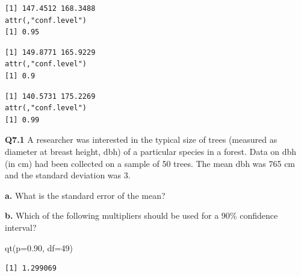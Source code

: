 \documentclass[
  oneside]{krantz}
\newenvironment{Shaded}{\begin{snugshade}}{\end{snugshade}}
\newcommand{\AttributeTok}[1]{\textcolor[rgb]{0.77,0.63,0.00}{#1}}
\newcommand{\CommentTok}[1]{\textcolor[rgb]{0.56,0.35,0.01}{\textit{#1}}}
\newcommand{\DecValTok}[1]{\textcolor[rgb]{0.00,0.00,0.81}{#1}}
\newcommand{\FloatTok}[1]{\textcolor[rgb]{0.00,0.00,0.81}{#1}}
\newcommand{\FunctionTok}[1]{\textcolor[rgb]{0.00,0.00,0.00}{#1}}
\newcommand{\NormalTok}[1]{#1}
\newcommand{\SpecialCharTok}[1]{\textcolor[rgb]{0.00,0.00,0.00}{#1}}
\begin{document}
\begin{verbatim}
[1] 147.4512 168.3488
attr(,"conf.level")
[1] 0.95
\end{verbatim}

\begin{Shaded}
\end{Shaded}

\begin{verbatim}
[1] 149.8771 165.9229
attr(,"conf.level")
[1] 0.9
\end{verbatim}

\begin{Shaded}
\end{Shaded}

\begin{verbatim}
[1] 140.5731 175.2269
attr(,"conf.level")
[1] 0.99
\end{verbatim}

\textbf{Q7.1} A researcher was interested in the typical size of trees (measured as diameter at breast height, dbh) of a particular species in a forest. Data on dbh (in cm) had been collected on a sample of 50 trees. The mean dbh was 765 cm and the standard deviation was 3.

\textbf{a.} What is the standard error of the mean?

\textbf{b.} Which of the following multipliers should be used for a 90\% confidence interval?

\begin{Shaded}
\begin{Highlighting}[]
\FunctionTok{qt}\NormalTok{(}\AttributeTok{p=}\FloatTok{0.90}\NormalTok{, }\AttributeTok{df=}\DecValTok{49}\NormalTok{)}
\end{Highlighting}
\end{Shaded}

\begin{verbatim}
[1] 1.299069
\end{verbatim}
\end{document}
